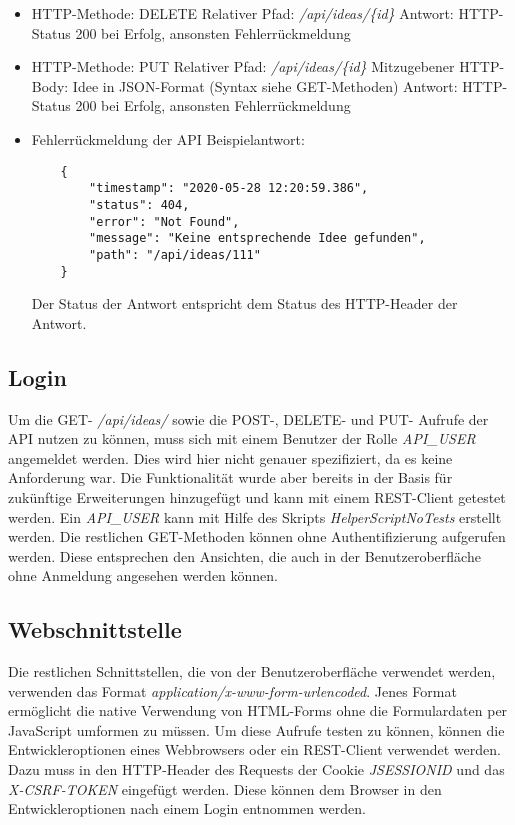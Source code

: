 \begin{itemize}
    \item HTTP-Methode: DELETE
    \subitem Relativer Pfad: \textit{/api/ideas/\{id\}}
    \subitem Antwort: HTTP-Status 200 bei Erfolg, ansonsten Fehlerrückmeldung
\end{itemize}

\begin{itemize}
    \item HTTP-Methode: PUT
    \subitem Relativer Pfad: \textit{/api/ideas/\{id\}}
    \subitem Mitzugebener HTTP-Body: Idee in JSON-Format (Syntax siehe GET-Methoden)
    \subitem Antwort: HTTP-Status 200 bei Erfolg, ansonsten Fehlerrückmeldung
\end{itemize}

\begin{itemize}
    \item Fehlerrückmeldung der API
    \subitem Beispielantwort:
    \begin{verbatim}
    {
        "timestamp": "2020-05-28 12:20:59.386",
        "status": 404,
        "error": "Not Found",
        "message": "Keine entsprechende Idee gefunden",
        "path": "/api/ideas/111"
    }
    \end{verbatim}
    \subitem Der Status der Antwort entspricht dem Status des HTTP-Header der Antwort.
\end{itemize}

\subsection{Login}
Um die GET- \textit{/api/ideas/} sowie die POST-, DELETE- und PUT- Aufrufe der API nutzen zu können, muss sich mit einem Benutzer der Rolle \textit{API\_USER} angemeldet werden.
Dies wird hier nicht genauer spezifiziert, da es keine Anforderung war.
Die Funktionalität wurde aber bereits in der Basis für zukünftige Erweiterungen hinzugefügt und kann mit einem REST-Client getestet werden.
Ein \textit{API\_USER} kann mit Hilfe des Skripts \textit{HelperScriptNoTests} erstellt werden.
Die restlichen GET-Methoden können ohne Authentifizierung aufgerufen werden. Diese entsprechen den Ansichten, die auch in der Benutzeroberfläche ohne Anmeldung angesehen werden können.

\subsection{Webschnittstelle}
Die restlichen Schnittstellen, die von der Benutzeroberfläche verwendet werden, verwenden das Format \textit{application/x-www-form-urlencoded}.
Jenes Format ermöglicht die native Verwendung von HTML-Forms ohne die Formulardaten per JavaScript umformen zu müssen.
Um diese Aufrufe testen zu können, können die Entwickleroptionen eines Webbrowsers oder ein REST-Client verwendet werden.
Dazu muss in den HTTP-Header des Requests der Cookie \textit{JSESSIONID} und das \textit{X-CSRF-TOKEN} eingefügt werden.
Diese können dem Browser in den Entwickleroptionen nach einem Login entnommen werden.